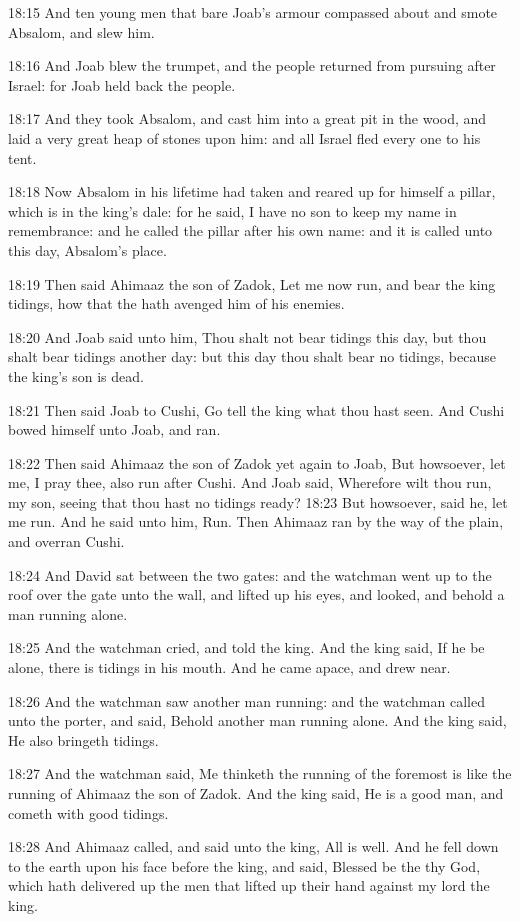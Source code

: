 18:15 And ten young men that bare Joab's armour compassed about and
smote Absalom, and slew him.

18:16 And Joab blew the trumpet, and the people returned from pursuing
after Israel: for Joab held back the people.

18:17 And they took Absalom, and cast him into a great pit in the
wood, and laid a very great heap of stones upon him: and all Israel
fled every one to his tent.

18:18 Now Absalom in his lifetime had taken and reared up for himself
a pillar, which is in the king's dale: for he said, I have no son to
keep my name in remembrance: and he called the pillar after his own
name: and it is called unto this day, Absalom's place.

18:19 Then said Ahimaaz the son of Zadok, Let me now run, and bear the
king tidings, how that the \LORD hath avenged him of his enemies.

18:20 And Joab said unto him, Thou shalt not bear tidings this day,
but thou shalt bear tidings another day: but this day thou shalt bear
no tidings, because the king's son is dead.

18:21 Then said Joab to Cushi, Go tell the king what thou hast seen.
And Cushi bowed himself unto Joab, and ran.

18:22 Then said Ahimaaz the son of Zadok yet again to Joab, But
howsoever, let me, I pray thee, also run after Cushi. And Joab said,
Wherefore wilt thou run, my son, seeing that thou hast no tidings
ready?  18:23 But howsoever, said he, let me run. And he said unto
him, Run. Then Ahimaaz ran by the way of the plain, and overran Cushi.

18:24 And David sat between the two gates: and the watchman went up to
the roof over the gate unto the wall, and lifted up his eyes, and
looked, and behold a man running alone.

18:25 And the watchman cried, and told the king. And the king said, If
he be alone, there is tidings in his mouth. And he came apace, and
drew near.

18:26 And the watchman saw another man running: and the watchman
called unto the porter, and said, Behold another man running alone.
And the king said, He also bringeth tidings.

18:27 And the watchman said, Me thinketh the running of the foremost
is like the running of Ahimaaz the son of Zadok. And the king said, He
is a good man, and cometh with good tidings.

18:28 And Ahimaaz called, and said unto the king, All is well. And he
fell down to the earth upon his face before the king, and said,
Blessed be the \LORD thy God, which hath delivered up the men that
lifted up their hand against my lord the king.


